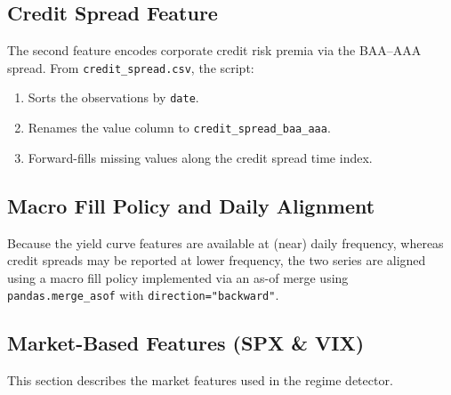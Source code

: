 \documentclass[a4paper,fleqn]{cas-sc}
\begin{document}
\subsection{Credit Spread Feature}
The second feature encodes corporate credit risk premia via the BAA--AAA spread. From \texttt{credit\_spread.csv}, the script:
\begin{enumerate}
    \item Sorts the observations by \texttt{date}.
    \item Renames the value column to \texttt{credit\_spread\_baa\_aaa}.
    \item Forward-fills missing values along the credit spread time index.
\end{enumerate}

\subsection{Macro Fill Policy and Daily Alignment}
Because the yield curve features are available at (near) daily frequency, whereas credit spreads may be reported at lower frequency, the two series are aligned using a macro fill policy implemented via an as-of merge using \texttt{pandas.merge\_asof} with \texttt{direction="backward"}.

\subsection{Market-Based Features (SPX \& VIX)}
This section describes the market features used in the regime detector.
\end{document}
